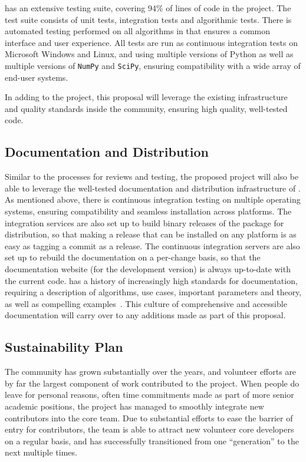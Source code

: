 \sklearn{} has an extensive testing suite, covering 94\% of lines of code in the project.
The test suite consists of unit tests, integration tests and algorithmic tests.
There is automated testing performed on all algorithms in \sklearn{} that ensures a common
interface and user experience.
All tests are run as continuous integration tests on Microsoft Windows and Linux, and using
multiple versions of Python as well as multiple versions of \texttt{NumPy} and \texttt{SciPy}, ensuring
compatibility with a wide array of end-user systems.

In adding to the \sklearn{} project, this proposal will leverage the existing infrastructure
and quality standards inside the \sklearn{} community, ensuring high quality, well-tested code.

\subsection{Documentation and Distribution}
Similar to the processes for reviews and testing, the proposed project will
also be able to leverage the well-tested documentation and distribution
infrastructure of \sklearn{}.
As mentioned above, there is continuous integration testing on multiple operating systems,
ensuring compatibility and seamless installation across platforms.
The integration services are also set up to build binary releases of the \sklearn{} package
for distribution, so that making a release that can be installed on any platform is as
easy as tagging a commit as a release.
The continuous integration servers are also set up to rebuild the documentation on a per-change
basis, so that the documentation website (for the development version) is always up-to-date
with the current code.
\sklearn{} has a history of increasingly high standards for documentation,
requiring a description of algorithms, use cases, important parameters and theory,
as well as compelling examples~\autocite{lovesklearn, benlorica}. This culture of comprehensive and accessible documentation
will carry over to any additions made as part of this proposal.

\subsection{Sustainability Plan}
The \sklearn{} community has grown substantially over the years, and volunteer efforts
are by far the largest component of work contributed to the project.
When people do leave for personal reasons, often time commitments made as part
of more senior academic positions, the project has managed to smoothly integrate new
contributors into the core team. Due to substantial efforts to ease the barrier
of entry for contributors, the \sklearn{} team is able to attract new volunteer
core developers on a regular basis, and has successfully transitioned from one
``generation'' to the next multiple times. 

